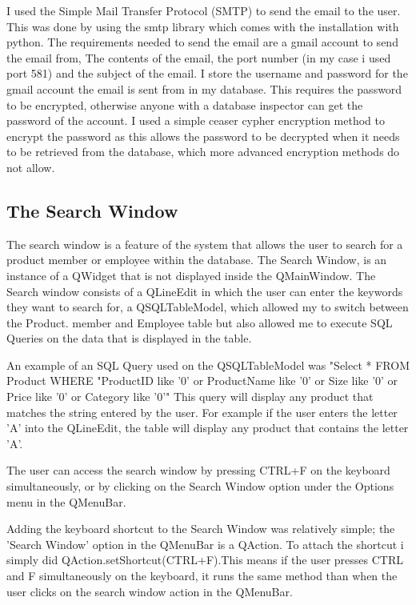 I used the Simple Mail Transfer Protocol (SMTP) to send the email to the user. This was done by using the smtp library which comes with the installation with python. The requirements needed to send the email are a gmail account to send the email from, The contents of the email, the port number (in my case i used port 581) and the subject of the email. I store the username and password for the gmail account the email is sent from in my database. This requires the password to be encrypted, otherwise anyone with a database inspector can get the password of the account. I used a simple ceaser cypher encryption method to encrypt the password as this allows the password to be decrypted when it needs to be retrieved from the database, which more advanced encryption methods do not allow.


\subsection{The Search Window}

The search window is a feature of the system that allows the user to search for a product member or employee within the database. The Search Window, is an instance of a QWidget that is not displayed inside the QMainWindow. The Search window consists of a QLineEdit in which the user can enter the keywords they want to search for, a QSQLTableModel, which allowed my to switch between the Product. member and Employee table but also allowed me to execute SQL Queries on the data that is displayed in the table. 

An example of an  SQL Query used on the QSQLTableModel was "Select * FROM Product WHERE "ProductID like '{0}' or ProductName like '{0}' or Size like '{0}' or Price like '{0}' or Category like '{0}'" This query will display any product that matches the string entered by the user. For example if the user enters the letter 'A' into the QLineEdit, the table will display any product that contains the letter 'A'. 

The user can access the search window by pressing CTRL+F on the keyboard simultaneously, or by clicking on the Search Window option under the Options menu in the QMenuBar. 

Adding the keyboard shortcut to the Search Window was relatively simple; the 'Search Window' option in the QMenuBar is a QAction. To attach the shortcut i simply did QAction.setShortcut(CTRL+F).This means if the user presses CTRL and F simultaneously on the keyboard, it runs the same method than when the user clicks on the search window action in the QMenuBar. 

